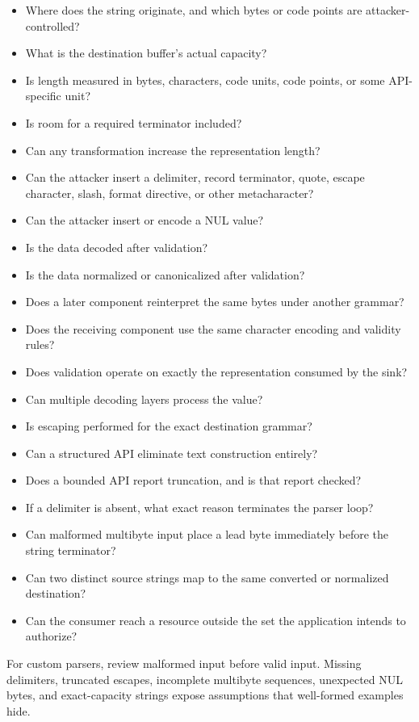 \documentclass[11pt]{article}
\begin{document}
\begin{itemize}
  \item Where does the string originate, and which bytes or code points are attacker-controlled?
  \item What is the destination buffer's actual capacity?
  \item Is length measured in bytes, characters, code units, code points, or some API-specific unit?
  \item Is room for a required terminator included?
  \item Can any transformation increase the representation length?
  \item Can the attacker insert a delimiter, record terminator, quote, escape character, slash, format directive, or other metacharacter?
  \item Can the attacker insert or encode a NUL value?
  \item Is the data decoded after validation?
  \item Is the data normalized or canonicalized after validation?
  \item Does a later component reinterpret the same bytes under another grammar?
  \item Does the receiving component use the same character encoding and validity rules?
  \item Does validation operate on exactly the representation consumed by the sink?
  \item Can multiple decoding layers process the value?
  \item Is escaping performed for the exact destination grammar?
  \item Can a structured API eliminate text construction entirely?
  \item Does a bounded API report truncation, and is that report checked?
  \item If a delimiter is absent, what exact reason terminates the parser loop?
  \item Can malformed multibyte input place a lead byte immediately before the string terminator?
  \item Can two distinct source strings map to the same converted or normalized destination?
  \item Can the consumer reach a resource outside the set the application intends to authorize?
\end{itemize}

\begin{auditheuristic}
For custom parsers, review malformed input before valid input. Missing delimiters, truncated escapes, incomplete multibyte sequences, unexpected NUL bytes, and exact-capacity strings expose assumptions that well-formed examples hide.
\end{auditheuristic}
\clearpage
\end{document}
